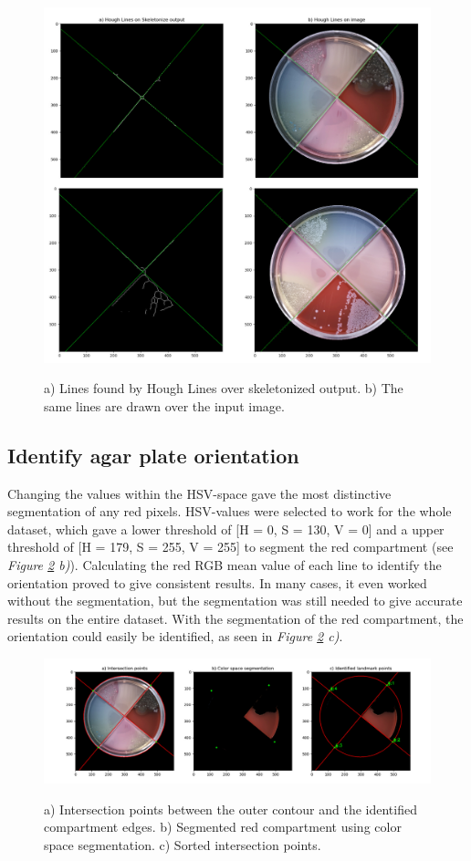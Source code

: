 \begin{figure}[H]
    \centering
      \includegraphics[width=.81\linewidth]{figures/PDF/Hough_lines_double.pdf}\\
    \caption{a) Lines found by Hough Lines over skeletonized output. b) The same lines are drawn over the input image.}
    \label{fig:result houghlines}
\end{figure}

\subsection{Identify agar plate orientation}
Changing the values within the HSV-space gave the most distinctive segmentation of any red pixels. HSV-values were selected to work for the whole dataset, which gave a lower threshold of [H = 0, S = 130, V = 0] and a upper threshold of [H = 179, S = 255, V = 255] to segment the red compartment (see \textit{Figure \ref{fig:result segmentation} b)}). Calculating the red RGB mean value of each line to identify the orientation proved to give consistent results. In many cases, it even worked without the segmentation, but the segmentation was still needed to give accurate results on the entire dataset. With the segmentation of the red compartment, the orientation could easily be identified, as seen in \textit{Figure \ref{fig:result segmentation} c)}. 

\begin{figure}[H]
    \centering
      \includegraphics[width=.85\linewidth]{figures/PDF/Segmentation.pdf}\\
    \caption{a) Intersection points between the outer contour and the identified compartment edges. b) Segmented red compartment using color space segmentation. c) Sorted intersection points. }
    \label{fig:result segmentation}
\end{figure}

